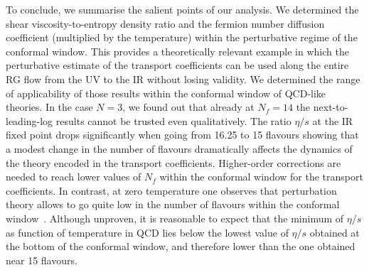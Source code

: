 To conclude, we summarise the salient points of our analysis. We determined the shear viscosity-to-entropy density ratio and the fermion number diffusion coefficient (multiplied by the temperature) within the perturbative regime of the conformal window. This provides a theoretically relevant example in which the perturbative estimate of the transport coefficients can be used along the entire RG flow from the UV to the IR without losing validity. We determined the range of applicability of those results within the conformal window of QCD-like theories. In the case $N=3$, we found out that already at $N_f=14$ the next-to-leading-log results cannot be trusted even qualitatively. The ratio $\eta/s$ at the IR fixed point drops significantly when going from 16.25 to 15 flavours showing that a modest change in the number of flavours dramatically affects the dynamics of the theory encoded in the transport coefficients. Higher-order corrections are needed to reach lower values of $N_f$ within the conformal window for the transport coefficients. In contrast, at zero temperature one observes that perturbation theory allows to go quite low in the number of flavours within the conformal window~\cite{Pica:2010mt,Pica:2010xq,Ryttov:2010iz,Ryttov:2016ner}. Although unproven, it is reasonable to expect that the minimum of $\eta/s$ as function of temperature in QCD lies below the lowest value of $\eta/s$ obtained at the bottom of the conformal window, and therefore lower than the one obtained near 15 flavours. 



